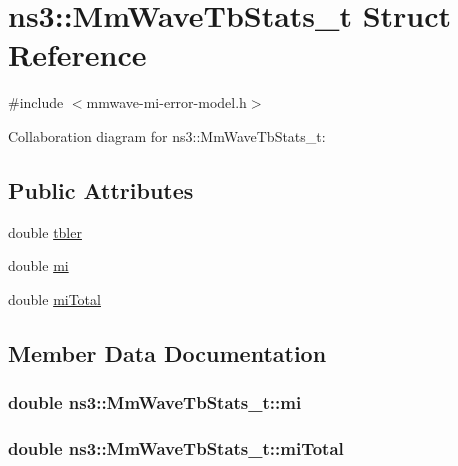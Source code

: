 \hypertarget{structns3_1_1MmWaveTbStats__t}{}\section{ns3\+:\+:Mm\+Wave\+Tb\+Stats\+\_\+t Struct Reference}
\label{structns3_1_1MmWaveTbStats__t}


{\ttfamily \#include $<$mmwave-\/mi-\/error-\/model.\+h$>$}



Collaboration diagram for ns3\+:\+:Mm\+Wave\+Tb\+Stats\+\_\+t\+:
\subsection*{Public Attributes}
\begin{DoxyCompactItemize}
\item 
double \hyperlink{structns3_1_1MmWaveTbStats__t_a9442403a142e9b6d5c226356b2dee04e}{tbler}
\item 
double \hyperlink{structns3_1_1MmWaveTbStats__t_a6853685f489b0b05e887c9c64717b7dc}{mi}
\item 
double \hyperlink{structns3_1_1MmWaveTbStats__t_a002b44e16c3a7e528e60d59d98f1d4dc}{mi\+Total}
\end{DoxyCompactItemize}


\subsection{Member Data Documentation}
\subsubsection[{\texorpdfstring{mi}{mi}}]{\setlength{\rightskip}{0pt plus 5cm}double ns3\+::\+Mm\+Wave\+Tb\+Stats\+\_\+t\+::mi}\hypertarget{structns3_1_1MmWaveTbStats__t_a6853685f489b0b05e887c9c64717b7dc}{}\label{structns3_1_1MmWaveTbStats__t_a6853685f489b0b05e887c9c64717b7dc}
\subsubsection[{\texorpdfstring{mi\+Total}{miTotal}}]{\setlength{\rightskip}{0pt plus 5cm}double ns3\+::\+Mm\+Wave\+Tb\+Stats\+\_\+t\+::mi\+Total}\hypertarget{structns3_1_1MmWaveTbStats__t_a002b44e16c3a7e528e60d59d98f1d4dc}{}\label{structns3_1_1MmWaveTbStats__t_a002b44e16c3a7e528e60d59d98f1d4dc}
